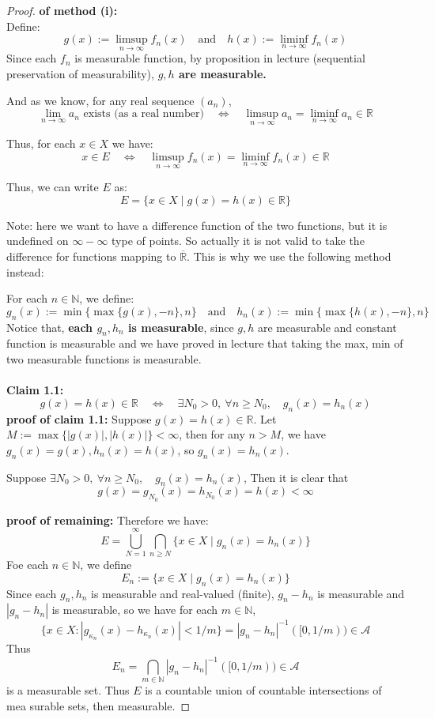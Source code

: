 \documentclass[lang=cn,11pt]{elegantbook}
\begin{document}
\begin{proof}
   \textbf{ of method (i):}\\
   Define:
\[
g(x):=\limsup_{n\to\infty} f_n(x) \quad\text{and}\quad h(x):=\liminf_{n\to\infty} f_n(x)
\]
Since each $f_n$ is measurable function, by proposition in lecture (sequential preservation of measurability), \textbf{$g,h$ are measurable.}

And as we know, for any real sequence \((a_n)\),
\[
\lim_{n\to\infty} a_n \text{ exists (as a real number)} \quad\Longleftrightarrow\quad \limsup_{n\to\infty} a_n = \liminf_{n\to\infty} a_n \in \mathbb{R}
\]

Thus, for each \(x\in X\) we have:
\[
x\in E \quad\Longleftrightarrow\quad \limsup_{n\to\infty} f_n(x)=\liminf_{n\to\infty} f_n(x)\in \mathbb{R}
\]

Thus, we can write $E$ as:
\[
E = \{x\in X \mid g(x)=h(x)\in \mathbb{R}   \}
\]

Note: here we want to have a difference function of the two functions, but it is undefined on $\infty - \infty$ type of points. So actually it is not valid to take the difference for functions mapping to $\overline{\mathbb{R}}$. This is why we use the following method instead:

For each \(n \in \mathbb{N}\), we define:
\[
g_n(x):=\min\{\max\{g(x), -n\}, n\} \quad \text{and} \quad h_n(x):=\min\{\max\{h(x), -n\},n\}
\]
Notice that, \textbf{each $g_n, h_n$ is measurable}, since $g,h$ are measurable and constant function is measurable and we have proved in lecture that taking the max, min of two measurable functions is measurable.\\\\
\noindent \textbf{Claim 1.1: \[
g(x)=h(x)\in\mathbb{R}\quad\Longleftrightarrow\quad \exists N_0>0,\ \forall n\ge N_0,\quad g_n(x)=h_n(x)
\]}
\noindent \textbf{proof of claim 1.1:}
Suppose $g(x)=h(x)\in\mathbb{R}$. Let \(M:=\max\{|g(x)|, |h(x)|\} < \infty\), then for any \(n> M\), we have
   \(
   g_n(x)=g(x),  h_n(x)=h(x)\), so \(g_n(x)=h_n(x)\). 

Suppose \(\exists N_0>0,\ \forall n\ge N_0,\quad g_n(x)=h_n(x)\), Then it is clear that  \[
 g(x) =  g_{N_0}(x) = h_{N_0}(x)=h(x) < \infty
   \]

\noindent \textbf{proof of remaining:}
Therefore we have:
\begin{equation}
    E = \bigcup_{N=1}^\infty \bigcap_{n\ge N} \{x\in X \mid g_{n}(x)=h_{n}(x)\}
\end{equation}
Foe each $n \in \mathbb{N}$, we define
\[
E_n := \{x\in X \mid  g_{n}(x)=h_{n}(x)\}
\]
Since each $g_n, h_n$ is measurable and real-valued (finite), $g_n - h_n$ is measurable and $|g_n - h_n|$ is measurable, so we have for each $m\in \mathbb{N}$,
\[
\{x\in X: |g_{\kappa_n}(x)-h_{\kappa_n}(x)|<1/m\}  = |g_n - h_n|^{-1} ([0,1/m)) \in \mathcal{A}
\]
Thus \[E_n = \bigcap_{m\in \mathbb{N}}|g_n - h_n|^{-1} ([0,1/m)) \in \mathcal{A}\] is a measurable set.
Thus $E$ is a countable union of countable intersections of mea
surable sets, then measurable. 
\end{proof}
\end{document}

